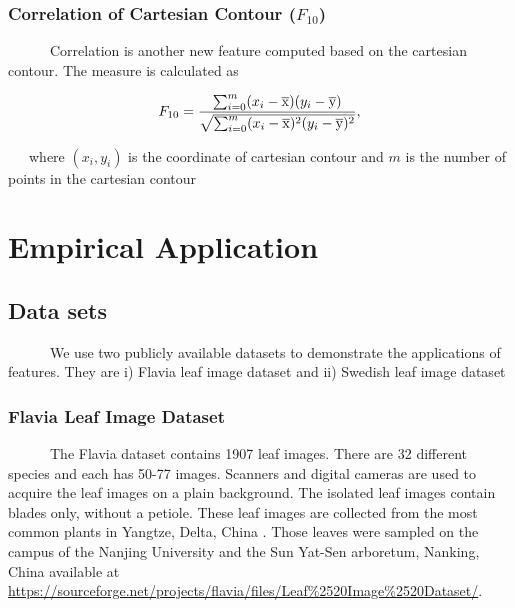 \documentclass{article}
\begin{document}
\hypertarget{correlation-of-cartesian-contour-f_10}{%
\subsubsection{\texorpdfstring{Correlation of Cartesian Contour
(\(F_{10}\))}{Correlation of Cartesian Contour (F\_\{10\})}}\label{correlation-of-cartesian-contour-f_10}}

~~~~~~Correlation is another new feature computed based on the cartesian
contour. The measure is calculated as

\begin{equation}
   F_{10} =  \frac{\sum_{i=0}^{m}(x_i - \overline{\rm x})(y_i - \overline{\rm y})}{\sqrt{\sum_{i=0}^{m} (x_i - \overline{\rm x})^2 (y_i - \overline{\rm y})^2}},
\label{equa_F10}
\end{equation}

~~~where \((x_i,y_i)\) is the coordinate of cartesian contour and
\(m\) is the number of points in the cartesian contour

\hypertarget{empirical-application}{%
\section{Empirical Application}\label{empirical-application}}

\hypertarget{data-sets}{%
\subsection{Data sets}\label{data-sets}}

~~~~~~We use two publicly available datasets to demonstrate the
applications of features. They are i) Flavia leaf image dataset and ii)
Swedish leaf image dataset

\hypertarget{flavia-leaf-image-dataset}{%
\subsubsection{Flavia Leaf Image
Dataset}\label{flavia-leaf-image-dataset}}

~~~~~~The Flavia dataset contains 1907 leaf images. There are 32
different species and each has 50-77 images. Scanners and digital
cameras are used to acquire the leaf images on a plain background. The
isolated leaf images contain blades only, without a petiole. These leaf
images are collected from the most common plants in Yangtze, Delta,
China \citep{articlee}. Those leaves were sampled on the campus
of the Nanjing University and the Sun Yat-Sen arboretum, Nanking, China
\citep{articlee} available at
\url{https://sourceforge.net/projects/flavia/files/Leaf%2520Image%2520Dataset/}.
\end{document}
